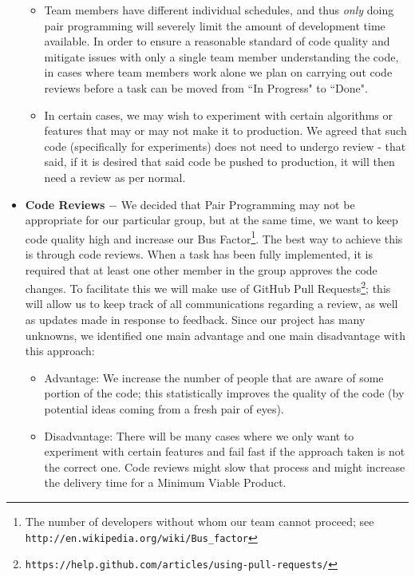 \documentclass[10pt]{article}
\begin{document}
\begin{itemize}
\begin{itemize}
\item Team members have different individual schedules, and thus \textit{only} doing pair programming will severely limit the amount of development time available. In order to ensure a reasonable standard of code quality and mitigate issues with only a single team member understanding the code, in cases where team members work alone we plan on carrying out code reviews before a task can be moved from ``In Progress" to ``Done".
\item In certain cases, we may wish to experiment with certain algorithms or features that may or may not make it to production. We agreed that such code (specifically for experiments) does not need to undergo review - that said, if it is desired that said code be pushed to production, it will then need a review as per normal.
\end{itemize}
\item \textbf{Code Reviews} $-$ We decided that Pair Programming may not be appropriate for our particular group, but at the same time, we want to keep code quality high and increase our Bus Factor\footnote{The number of developers without whom our team cannot proceed; see \texttt{http://en.wikipedia.org/wiki/Bus\_factor}}. The best way to achieve this is through code reviews. When a task has been fully implemented, it is required that at least one other member in the group approves the code changes. To facilitate this we will make use of GitHub Pull Requests\footnote{\texttt{https://help.github.com/articles/using-pull-requests/}}; this will allow us to keep track of all communications regarding a review, as well as updates made in response to feedback. Since our project has many unknowns, we identified one main advantage and one main disadvantage with this approach:
\begin{itemize}
\item Advantage: We increase the number of people that are aware of some portion of the code; this statistically improves the quality of the code (by potential ideas coming from a fresh pair of eyes). 
\item Disadvantage: There will be many cases where we only want to experiment with certain features and fail fast if the approach taken is not the correct one. Code reviews might slow that process and might increase the delivery time for a Minimum Viable Product. 
\end{itemize}
\end{itemize}
\end{document}
